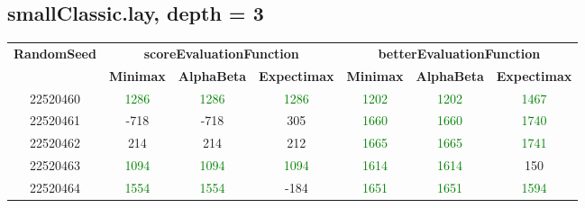 \documentclass[english, a4paper,12pt]{article}
\begin{document}
\subsection*{smallClassic.lay, depth = 3}
\small\begin{tabular}{|c|c|c|c|c|c|c|}
\hline
\textbf{RandomSeed} & \multicolumn{3}{c|}{\textbf{scoreEvaluationFunction}} & \multicolumn{3}{c|}{\textbf{betterEvaluationFunction}} \\
\cline{2-7}
& \textbf{Minimax} & \textbf{AlphaBeta} & \textbf{Expectimax} & \textbf{Minimax} & \textbf{AlphaBeta} & \textbf{Expectimax} \\
\hline
22520460 & \textcolor{Green}{1286} & \textcolor{Green}{1286} & \textcolor{Green}{1286} & \textcolor{Green}{1202} & \textcolor{Green}{1202} & \textcolor{Green}{1467} \\
22520461 & \textcolor{red!70}{-718} & \textcolor{red!70}{-718} & \textcolor{red!70}{305} & \textcolor{Green}{1660} & \textcolor{Green}{1660} & \textcolor{Green}{1740} \\
22520462 & \textcolor{red!70}{214} & \textcolor{red!70}{214} & \textcolor{red!70}{212} & \textcolor{Green}{1665} & \textcolor{Green}{1665} & \textcolor{Green}{1741} \\
22520463 & \textcolor{Green}{1094} & \textcolor{Green}{1094} & \textcolor{Green}{1094} & \textcolor{Green}{1614} & \textcolor{Green}{1614} & \textcolor{red!70}{150} \\
22520464 & \textcolor{Green}{1554} & \textcolor{Green}{1554} & \textcolor{red!70}{-184} & \textcolor{Green}{1651} & \textcolor{Green}{1651} & \textcolor{Green}{1594} \\
\hline
\end{tabular}
\end{document}
